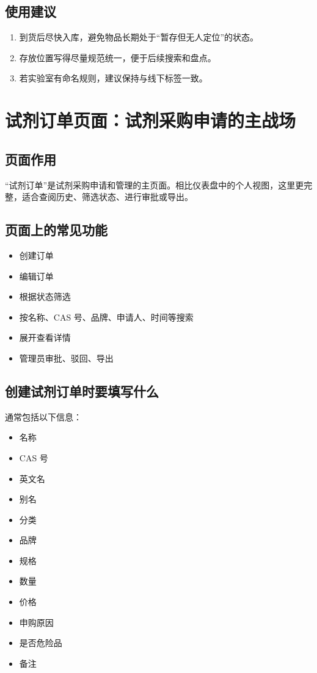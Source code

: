 \documentclass[12pt,a4paper]{ctexart}
\begin{document}
\subsection{使用建议}
\begin{enumerate}
  \item 到货后尽快入库，避免物品长期处于“暂存但无人定位”的状态。
  \item 存放位置写得尽量规范统一，便于后续搜索和盘点。
  \item 若实验室有命名规则，建议保持与线下标签一致。
\end{enumerate}

\newpage
\section{试剂订单页面：试剂采购申请的主战场}

\subsection{页面作用}
“试剂订单”是试剂采购申请和管理的主页面。相比仪表盘中的个人视图，这里更完整，适合查阅历史、筛选状态、进行审批或导出。

\subsection{页面上的常见功能}
\begin{itemize}
  \item 创建订单
  \item 编辑订单
  \item 根据状态筛选
  \item 按名称、CAS 号、品牌、申请人、时间等搜索
  \item 展开查看详情
  \item 管理员审批、驳回、导出
\end{itemize}

\subsection{创建试剂订单时要填写什么}
通常包括以下信息：
\begin{itemize}
  \item 名称
  \item CAS 号
  \item 英文名
  \item 别名
  \item 分类
  \item 品牌
  \item 规格
  \item 数量
  \item 价格
  \item 申购原因
  \item 是否危险品
  \item 备注
\end{itemize}
\end{document}
